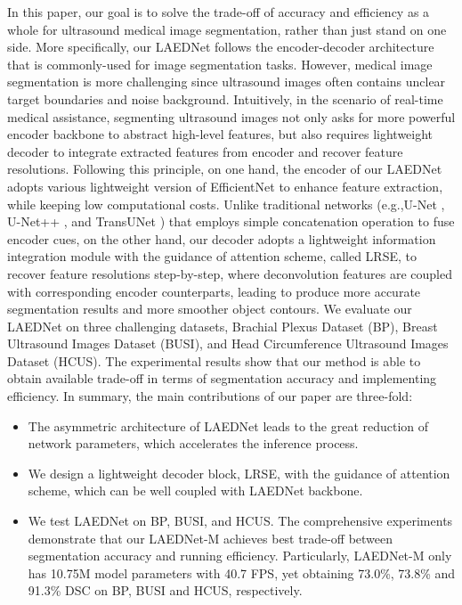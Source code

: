 \documentclass[review]{elsarticle}
\begin{document}
In this paper, our goal is to solve the trade-off of accuracy and efficiency as a whole for ultrasound medical image segmentation, rather than just stand on one side. More specifically, our LAEDNet follows the encoder-decoder architecture that is commonly-used for image segmentation tasks. However, medical image segmentation is more challenging since ultrasound images often contains unclear target boundaries and noise background. Intuitively, in the scenario of real-time medical assistance, segmenting ultrasound images not only asks for more powerful encoder backbone to abstract high-level features, but also requires lightweight decoder to integrate extracted features from encoder and recover feature resolutions. Following this principle, on one hand, the encoder of our LAEDNet adopts various lightweight version of EfficientNet \cite{2019EfficientNet} to enhance feature extraction, while keeping low computational costs. Unlike traditional networks (e.g.,U-Net \cite{2015U}, U-Net++ \cite{2020UNet}, and TransUNet \cite{chen2021transunet}) that employs simple concatenation operation to fuse encoder cues, on the other hand, our decoder adopts a lightweight information integration module with the guidance of attention scheme, called LRSE, to recover feature resolutions step-by-step, where deconvolution features are coupled with corresponding encoder counterparts, leading to produce more accurate segmentation results and more smoother object contours. We evaluate our LAEDNet on three challenging datasets, Brachial Plexus Dataset (BP)\cite{Kaggle}, Breast Ultrasound Images Dataset (BUSI)\cite{2019Dataset}, and Head Circumference Ultrasound Images Dataset (HCUS)\cite{2018Automated}. The experimental results show that our method is able to obtain available trade-off in terms of segmentation accuracy and implementing efficiency. In summary, the main contributions of our paper are three-fold: 
\begin{itemize}
\item The asymmetric architecture of LAEDNet leads to the great reduction of network parameters, which accelerates the inference process.
\item We design a lightweight decoder block, LRSE, with the guidance of attention scheme, which can be well coupled with LAEDNet backbone.
\item We test LAEDNet on BP\cite{Kaggle}, BUSI\cite{2019Dataset}, and HCUS\cite{2018Automated}. The comprehensive experiments demonstrate that our LAEDNet-M achieves best trade-off between segmentation accuracy and running efficiency. Particularly, LAEDNet-M only has 10.75M model parameters with 40.7 FPS, yet obtaining 73.0\%, 73.8\% and 91.3\% DSC on BP\cite{Kaggle}, BUSI\cite{2019Dataset} and HCUS\cite{2018Automated}, respectively.
\end{itemize}
 
\end{document}
